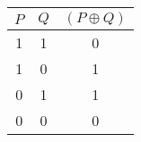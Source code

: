 \begin{tabular}{|c|c||c|}
\hline
$ P $ & $ Q $ & $ (P \oplus Q) $ \\
\hline
1 & 1 & 0 \\
1 & 0 & 1 \\
0 & 1 & 1 \\
0 & 0 & 0 \\
\hline
\end{tabular}
